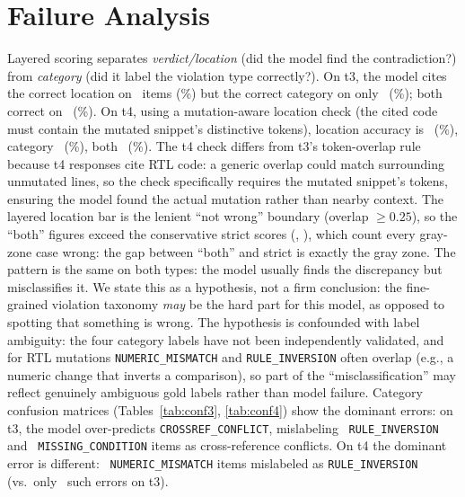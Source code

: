 \documentclass[11pt]{article}
\begin{document}
\section{Failure Analysis}
Layered scoring separates \emph{verdict/location} (did the model find the contradiction?) from \emph{category} (did it label the violation type correctly?). On t3, the model cites the correct location on \LayTthreeLoc\ items (\LayAccTthreeLoc\%) but the correct category on only \LayTthreeCat\ (\LayAccTthreeCat\%); both correct on \LayTthreeBoth\ (\LayAccTthreeBoth\%). On t4, using a mutation-aware location check (the cited code must contain the mutated snippet's distinctive tokens), location accuracy is \LayTfourLoc\ (\LayAccTfourLoc\%), category \LayTfourCat\ (\LayAccTfourCat\%), both \LayTfourBoth\ (\LayAccTfourBoth\%). The t4 check differs from t3's token-overlap rule because t4 responses cite RTL code: a generic overlap could match surrounding unmutated lines, so the check specifically requires the mutated snippet's tokens, ensuring the model found the actual mutation rather than nearby context. The layered location bar is the lenient ``not wrong'' boundary (overlap $\ge 0.25$), so the ``both'' figures exceed the conservative strict scores (\ConsTthree, \ConsTfour), which count every gray-zone case wrong: the gap between ``both'' and strict is exactly the gray zone. The pattern is the same on both types: the model usually finds the discrepancy but misclassifies it. We state this as a hypothesis, not a firm conclusion: the fine-grained violation taxonomy \emph{may} be the hard part for this model, as opposed to spotting that something is wrong. The hypothesis is confounded with label ambiguity: the four category labels have not been independently validated, and for RTL mutations \texttt{NUMERIC\_MISMATCH} and \texttt{RULE\_INVERSION} often overlap (e.g., a numeric change that inverts a comparison), so part of the ``misclassification'' may reflect genuinely ambiguous gold labels rather than model failure. Category confusion matrices (Tables~\ref{tab:conf3}, \ref{tab:conf4}) show the dominant errors: on t3, the model over-predicts \texttt{CROSSREF\_CONFLICT}, mislabeling \ConfTThreeRuleCross\ \texttt{RULE\_INVERSION} and \ConfTThreeMissCross\ \texttt{MISSING\_CONDITION} items as cross-reference conflicts. On t4 the dominant error is different: \ConfTFourNumRule\ \texttt{NUMERIC\_MISMATCH} items mislabeled as \texttt{RULE\_INVERSION} (vs.\ only \ConfTThreeNumRule\ such errors on t3).
\end{document}
